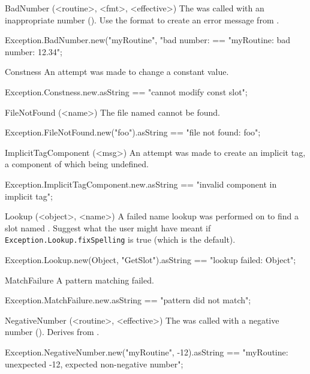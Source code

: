 \begin{urbiscriptapi}
\item[BadNumber](<routine>, <fmt>, <effective>)%
  The  was called with an inappropriate number
  ().  Use the format  to create an error
  message from .
\begin{urbiassert}
Exception.BadNumber.new("myRoutine", "bad number: %
  == "myRoutine: bad number: 12.34";
\end{urbiassert}

\item[Constness]%
  An attempt was made to change a constant value.
\begin{urbiassert}
Exception.Constness.new.asString
  == "cannot modify const slot";
\end{urbiassert}

\item[FileNotFound](<name>)%
  The file named  cannot be found.
\begin{urbiassert}
Exception.FileNotFound.new("foo").asString
  == "file not found: foo";
\end{urbiassert}

\item[ImplicitTagComponent](<msg>)%
  An attempt was made to create an implicit tag, a component of which
  being undefined.
\begin{urbiassert}
Exception.ImplicitTagComponent.new.asString
  == "invalid component in implicit tag";
\end{urbiassert}

\item[Lookup](<object>, <name>)%
  A failed name lookup was performed on  to find a slot named
  .  Suggest what the user might have meant if
  \lstinline|Exception.Lookup.fixSpelling| is true (which is the default).
\begin{urbiassert}
Exception.Lookup.new(Object, "GetSlot").asString
  == "lookup failed: Object";
\end{urbiassert}

\item[MatchFailure]%
  A pattern matching failed.
\begin{urbiassert}
Exception.MatchFailure.new.asString
  == "pattern did not match";
\end{urbiassert}

\item[NegativeNumber](<routine>, <effective>)%
  The  was called with a negative number
  ().  Derives from .
\begin{urbiassert}
Exception.NegativeNumber.new("myRoutine", -12).asString
== "myRoutine: unexpected -12, expected non-negative number";
\end{urbiassert}


\end{urbiscriptapi}
